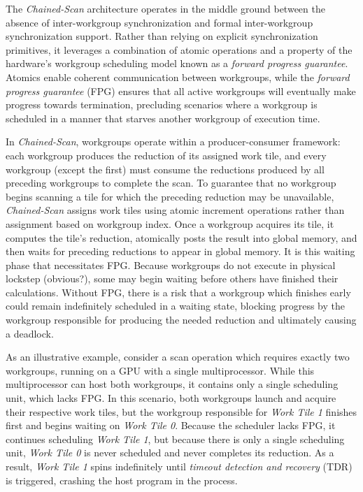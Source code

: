 \documentclass[sigconf]{acmart}
\begin{document}
 The \emph{Chained-Scan} architecture operates in the middle ground between the absence of inter-workgroup synchronization and formal inter-workgroup synchronization support. Rather than relying on explicit synchronization primitives, it leverages a combination of atomic operations and a property of the hardware's workgroup scheduling model known as a \emph{forward progress guarantee}. Atomics enable coherent communication between workgroups, while the \emph{forward progress guarantee} (FPG) ensures that all active workgroups will eventually make progress towards termination, precluding scenarios where a workgroup is scheduled in a manner that starves another workgroup of execution time.
 
 In \emph{Chained-Scan}, workgroups operate within a producer-consumer framework: each workgroup produces the reduction of its assigned work tile, and every workgroup (except the first) must consume the reductions produced by all preceding workgroups to complete the scan. To guarantee that no workgroup begins scanning a tile for which the preceding reduction may be unavailable, \emph{Chained-Scan} assigns work tiles using atomic increment operations rather than assignment based on workgroup index. Once a workgroup acquires its tile, it computes the tile’s reduction, atomically posts the result into global memory, and then waits for preceding reductions to appear in global memory. It is this waiting phase that necessitates FPG. Because workgroups do not execute in physical lockstep (obvious?), some may begin waiting before others have finished their calculations. Without FPG, there is a risk that a workgroup which finishes early could remain indefinitely scheduled in a waiting state, blocking progress by the workgroup responsible for producing the needed reduction and ultimately causing a deadlock. 
 
 As an illustrative example, consider a scan operation which requires exactly two workgroups, running on a GPU with a single multiprocessor. While this multiprocessor can host both workgroups, it contains only a single scheduling unit, which lacks FPG. In this scenario, both workgroups launch and acquire their respective work tiles, but the workgroup responsible for \emph{Work Tile 1} finishes first and begins waiting on \emph{Work Tile 0}. Because the scheduler lacks FPG, it continues scheduling \emph{Work Tile 1}, but because there is only a single scheduling unit, \emph{Work Tile 0} is never scheduled and never completes its reduction. As a result, \emph{Work Tile 1} spins indefinitely until \emph{timeout detection and recovery} (TDR) is triggered, crashing the host program in the process.
\end{document}
